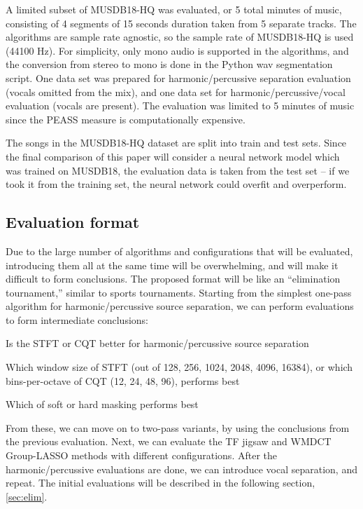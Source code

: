 \documentclass[letter,12pt]{article}
\newenvironment{tight_itemize}{
\begin{itemize}
  \setlength{\itemsep}{0pt}
  \setlength{\parskip}{0pt}
}{\end{itemize}}
\begin{document}
A limited subset of MUSDB18-HQ was evaluated, or 5 total minutes of music, consisting of 4 segments of 15 seconds duration taken from 5 separate tracks. The algorithms are sample rate agnostic, so the sample rate of MUSDB18-HQ is used (44100 Hz). For simplicity, only mono audio is supported in the algorithms, and the conversion from stereo to mono is done in the Python wav segmentation script. One data set was prepared for harmonic/percussive separation evaluation (vocals omitted from the mix), and one data set for harmonic/percussive/vocal evaluation (vocals are present). The evaluation was limited to 5 minutes of music since the PEASS measure is computationally expensive.

The songs in the MUSDB18-HQ dataset are split into train and test sets. Since the final comparison of this paper will consider a neural network model which was trained on MUSDB18, the evaluation data is taken from the test set -- if we took it from the training set, the neural network could overfit and overperform.

\subsection{Evaluation format}

Due to the large number of algorithms and configurations that will be evaluated, introducing them all at the same time will be overwhelming, and will make it difficult to form conclusions. The proposed format will be like an ``elimination tournament,'' similar to sports tournaments. Starting from the simplest one-pass algorithm for harmonic/percussive source separation, we can perform evaluations to form intermediate conclusions:

\begin{tight_itemize}
\item
	Is the STFT or CQT better for harmonic/percussive source separation
\item
	Which window size of STFT (out of 128, 256, 1024, 2048, 4096, 16384), or which bins-per-octave of CQT (12, 24, 48, 96), performs best
\item
	Which of soft or hard masking performs best
\end{tight_itemize} 

From these, we can move on to two-pass variants, by using the conclusions from the previous evaluation. Next, we can evaluate the TF jigsaw and WMDCT Group-LASSO methods with different configurations. After the harmonic/percussive evaluations are done, we can introduce vocal separation, and repeat. The initial evaluations will be described in the following section, \ref{sec:elim}.
\end{document}
